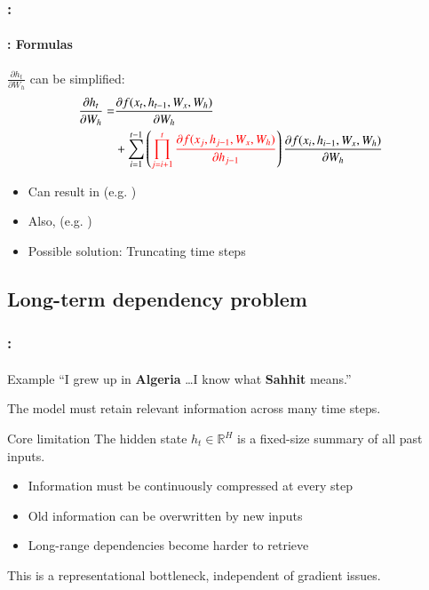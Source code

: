 \documentclass[xcolor=table]{beamer}
\begin{document}
\begin{frame}
	\frametitle{\insertshortsubtitle: \insertsection}
	\framesubtitle{\insertsubsection: Formulas}
	
	$\frac{\partial h_t}{\partial W_h}$ can be simplified:
	\begin{align*}
		\frac{\partial h_t}{\partial W_h}  = &
		\frac{\partial f(x_t, h_{t-1}, W_x, W_h)}{\partial W_h} \\
		& + 
		\sum_{i=1}^{t-1} \left( {\color{red} \prod_{j=i+1}^{t} \frac{\partial f(x_j, h_{j-1}, W_x, W_h)}{\partial h_{j-1}}} \right)
		\frac{\partial f(x_i, h_{i-1}, W_x, W_h)}{\partial W_h}\\
	\end{align*}
	
	\begin{itemize}
		\item Can result in  (e.g. )
		\item Also,  (e.g. )
		\item Possible solution: Truncating time steps \cite{2002-jaeger}
	\end{itemize}
	
\end{frame}

\subsection{Long-term dependency problem}

\begin{frame}
	\frametitle{\insertshortsubtitle: \insertsection}
	\framesubtitle{\insertsubsection}
	
	\begin{exampleblock}{Example}
		``I grew up in \textbf{Algeria} \dots I know what \textbf{Sahhit} means.''
	\end{exampleblock}
	
	The model must retain relevant information across many time steps.
	
	\begin{alertblock}{Core limitation}
		The hidden state $h_t \in \mathbb{R}^H$ is a fixed-size summary of all past inputs.
	\end{alertblock}
	
	\begin{itemize}
		\item Information must be continuously compressed at every step
		\item Old information can be overwritten by new inputs
		\item Long-range dependencies become harder to retrieve
	\end{itemize}
	
	\begin{center}
		This is a representational bottleneck, independent of gradient issues.
	\end{center}
	
\end{frame}
\end{document}
